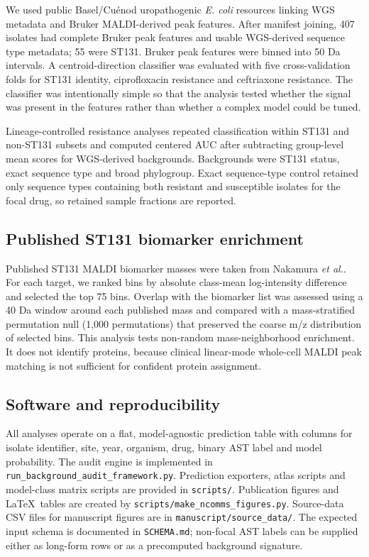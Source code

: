 \documentclass[11pt]{article}
\begin{document}
We used public Basel/Cu\'{e}nod uropathogenic \textit{E. coli} resources linking WGS metadata and Bruker MALDI-derived peak features\cite{cuenod2023papgii}. After manifest joining, 407 isolates had complete Bruker peak features and usable WGS-derived sequence type metadata; 55 were ST131. Bruker peak features were binned into 50 Da intervals. A centroid-direction classifier was evaluated with five cross-validation folds for ST131 identity, ciprofloxacin resistance and ceftriaxone resistance. The classifier was intentionally simple so that the analysis tested whether the signal was present in the features rather than whether a complex model could be tuned.

Lineage-controlled resistance analyses repeated classification within ST131 and non-ST131 subsets and computed centered AUC after subtracting group-level mean scores for WGS-derived backgrounds. Backgrounds were ST131 status, exact sequence type and broad phylogroup. Exact sequence-type control retained only sequence types containing both resistant and susceptible isolates for the focal drug, so retained sample fractions are reported.

\subsection*{Published ST131 biomarker enrichment}

Published ST131 MALDI biomarker masses were taken from Nakamura \textit{et al.}\cite{nakamura2019st131}. For each target, we ranked bins by absolute class-mean log-intensity difference and selected the top 75 bins. Overlap with the biomarker list was assessed using a 40 Da window around each published mass and compared with a mass-stratified permutation null (1,000 permutations) that preserved the coarse m/z distribution of selected bins. This analysis tests non-random mass-neighborhood enrichment. It does not identify proteins, because clinical linear-mode whole-cell MALDI peak matching is not sufficient for confident protein assignment.

\subsection*{Software and reproducibility}

All analyses operate on a flat, model-agnostic prediction table with columns for isolate identifier, site, year, organism, drug, binary AST label and model probability. The audit engine is implemented in \texttt{run\_background\_audit\_framework.py}. Prediction exporters, atlas scripts and model-class matrix scripts are provided in \texttt{scripts/}. Publication figures and \LaTeX\ tables are created by \texttt{scripts/make\_ncomms\_figures.py}. Source-data CSV files for manuscript figures are in \texttt{manuscript/source\_data/}. The expected input schema is documented in \texttt{SCHEMA.md}; non-focal AST labels can be supplied either as long-form rows or as a precomputed background signature.
\end{document}
